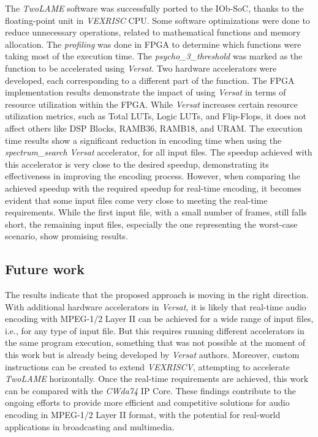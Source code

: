 The \textit{TwoLAME} software was successfully ported to the IOb-SoC, thanks to the floating-point unit in \textit{VEXRISC} CPU.
Some software optimizations were done to reduce unnecessary operations, related to mathematical functions and memory allocation.
The \textit{profiling} was done in FPGA to determine which functions were taking most of the execution time. The \textit{psycho\_3\_threshold} was marked as the function to be accelerated using \textit{Versat}.
Two hardware accelerators were developed, each corresponding to a different part of the function.
The FPGA implementation results demonstrate the impact of using \textit{Versat} in terms of resource utilization within the FPGA. While \textit{Versat} increases certain resource utilization metrics, such as Total LUTs, Logic LUTs, and Flip-Flops, it does not affect others like DSP Blocks, RAMB36, RAMB18, and URAM.
The execution time results show a significant reduction in encoding time when using the \textit{spectrum\_search} \textit{Versat} accelerator, for all input files. The speedup achieved with this accelerator is very close to the desired speedup, demonstrating its effectiveness in improving the encoding process.
However, when comparing the achieved speedup with the required speedup for real-time encoding, it becomes evident that some input files come very close to meeting the real-time requirements. While the first input file, with a small number of frames, still falls short, the remaining input files, especially the one representing the worst-case scenario, show promising results.

\subsection{Future work}

The results indicate that the proposed approach is moving in the right direction. With additional hardware accelerators in \textit{Versat}, it is likely that real-time audio encoding with MPEG-1/2 Layer II can be achieved for a wide range of input files, i.e., for any type of input file. But this requires running different accelerators in the same program execution, something that was not possible at the moment of this work but is already being developed by \textit{Versat} authors. 
Moreover, custom instructions can be created to extend \textit{VEXRISCV}, attempting to accelerate \textit{TwoLAME} horizontally.
Once the real-time requirements are achieved, this work can be compared with the  \textit{CWda74} IP Core.
These findings contribute to the ongoing efforts to provide more efficient and competitive solutions for audio encoding in MPEG-1/2 Layer II format, with the potential for real-world applications in broadcasting and multimedia.